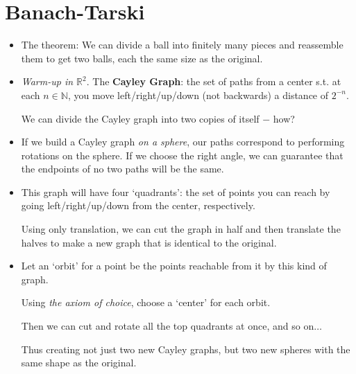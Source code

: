 \documentclass[justified]{tufte-handout}
\begin{document}
\section{Banach-Tarski}



\begin{itemize}

\item The theorem: We can divide a ball into finitely many pieces and reassemble them to get two balls, each the same size as the original.

\item \emph{Warm-up in $\mathbb{R}^2$}. The \textbf{Cayley Graph}: the set of paths from a center s.t. at each $n\in\mathbb{N}$, you move left/right/up/down (not backwards) a distance of $2^{-n}$.\vspace{.2cm}

We can divide the Cayley graph into two copies of itself $-$ how?\vspace{.2cm}


\item  If we build a Cayley graph \emph{on a sphere}, our paths correspond to performing rotations on the sphere. If we choose the right angle, we can guarantee that the endpoints of no two paths will be the same.


\item This graph will have four `quadrants': the set of points you can reach by going left/right/up/down from the center, respectively. \vspace{.2cm}

Using only translation, we can cut the graph in half and then translate the halves to make a new graph that is identical to the original.\vspace{.2cm}


\item Let an `orbit' for a point be the points reachable from it by this kind of graph. \vspace{.2cm}

Using \emph{the axiom of choice}, choose a `center' for each orbit. \vspace{.2cm}

Then we can cut and rotate all the top quadrants at once, and so on$\dots$\vspace{.2cm}

Thus creating not just two new Cayley graphs, but two new spheres with the same shape as the original. \


\end{itemize}
\end{document}
